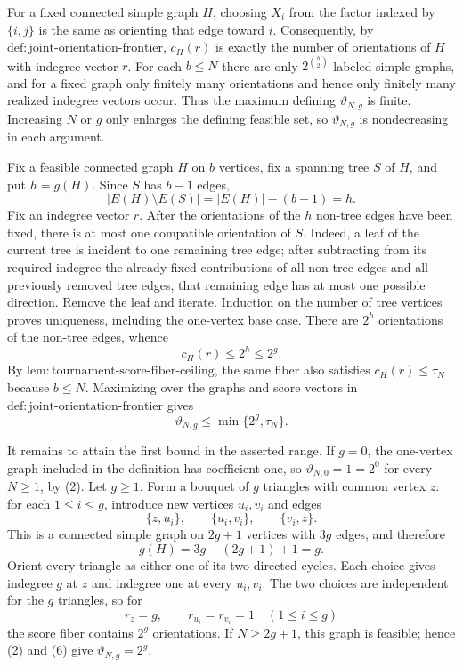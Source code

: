 For a fixed connected simple graph \(H\), choosing \(X_i\) from the factor indexed by \(\{i,j\}\) is the same as orienting that edge toward \(i\).  Consequently, by \(\mathrm{def:joint\mbox{-}orientation\mbox{-}frontier}\), \(c_H(r)\) is exactly the number of orientations of \(H\) with indegree vector \(r\).  For each \(b\leq N\) there are only \(2^{\binom b2}\) labeled simple graphs, and for a fixed graph only finitely many orientations and hence only finitely many realized indegree vectors occur.  Thus the maximum defining \(\vartheta_{N,g}\) is finite.  Increasing \(N\) or \(g\) only enlarges the defining feasible set, so \(\vartheta_{N,g}\) is nondecreasing in each argument.

Fix a feasible connected graph \(H\) on \(b\) vertices, fix a spanning tree \(S\) of \(H\), and put \(h=g(H)\).  Since \(S\) has \(b-1\) edges,
\[
 |E(H)\setminus E(S)|=|E(H)|-(b-1)=h.
\tag{1}
\]
Fix an indegree vector \(r\).  After the orientations of the \(h\) non-tree edges have been fixed, there is at most one compatible orientation of \(S\).  Indeed, a leaf of the current tree is incident to one remaining tree edge; after subtracting from its required indegree the already fixed contributions of all non-tree edges and all previously removed tree edges, that remaining edge has at most one possible direction.  Remove the leaf and iterate.  Induction on the number of tree vertices proves uniqueness, including the one-vertex base case.  There are \(2^h\) orientations of the non-tree edges, whence
\[
 c_H(r)\leq 2^h\leq 2^g.
\tag{2}
\]
By \(\mathrm{lem:tournament\mbox{-}score\mbox{-}fiber\mbox{-}ceiling}\), the same fiber also satisfies \(c_H(r)\leq\tau_N\) because \(b\leq N\).  Maximizing over the graphs and score vectors in \(\mathrm{def:joint\mbox{-}orientation\mbox{-}frontier}\) gives
\[
 \vartheta_{N,g}\leq\min\{2^g,\tau_N\}.
\tag{3}
\]

It remains to attain the first bound in the asserted range.  If \(g=0\), the one-vertex graph included in the definition has coefficient one, so \(\vartheta_{N,0}=1=2^0\) for every \(N\geq1\), by (2).  Let \(g\geq1\).  Form a bouquet of \(g\) triangles with common vertex \(z\): for each \(1\leq i\leq g\), introduce new vertices \(u_i,v_i\) and edges
\[
 \{z,u_i\},\qquad \{u_i,v_i\},\qquad \{v_i,z\}.
\tag{4}
\]
This is a connected simple graph on \(2g+1\) vertices with \(3g\) edges, and therefore
\[
 g(H)=3g-(2g+1)+1=g.
\tag{5}
\]
Orient every triangle as either one of its two directed cycles.  Each choice gives indegree \(g\) at \(z\) and indegree one at every \(u_i,v_i\).  The two choices are independent for the \(g\) triangles, so for
\[
 r_z=g,\qquad r_{u_i}=r_{v_i}=1\quad(1\leq i\leq g)
\tag{6}
\]
the score fiber contains \(2^g\) orientations.  If \(N\geq2g+1\), this graph is feasible; hence (2) and (6) give \(\vartheta_{N,g}=2^g\).

